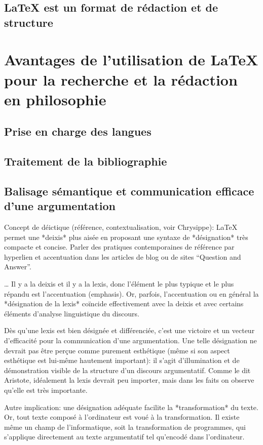 \documentclass{article}
\begin{document}
\subsection{\LaTeX{} est un format de rédaction et de structure}

\section{Avantages de l’utilisation de \LaTeX{} pour la recherche et la rédaction en philosophie}

\subsection{Prise en charge des langues}

\subsection{Traitement de la bibliographie}

\subsection{Balisage sémantique et communication efficace d’une argumentation}

Concept de déictique (référence, contextualisation, voir Chrysippe): LaTeX permet une *deixis* plus aisée en proposant une syntaxe de *désignation* très compacte et concise. Parler des pratiques contemporaines de référence par hyperlien et accentuation dans les articles de blog ou de sites “Question and Answer”.

… Il y a la deixis et il y a la lexis, donc l’élément le plus typique et le plus répandu est l’accentuation (emphasis). Or, parfois, l’accentuation ou en général la *désignation de la lexis* coïncide effectivement avec la deixis et avec certains éléments d’analyse linguistique du discours.

Dès qu’une lexis est bien désignée et différenciée, c’est une victoire et un vecteur d’efficacité pour la communication d’une argumentation. Une telle désignation ne devrait pas être perçue comme purement esthétique (même si son aspect esthétique est lui-même hautement important): il s’agit d’illumination et de démonstration visible de la structure d’un discours argumentatif. Comme le dit Aristote, idéalement la lexis devrait peu importer, mais dans les faits on observe qu’elle est très importante.

Autre implication: une désignation adéquate facilite la *transformation* du texte. Or, tout texte composé à l’ordinateur est voué à la transformation. Il existe même un champ de l’informatique, soit la transformation de programmes, qui s’applique directement au texte argumentatif tel qu’encodé dans l’ordinateur.
\end{document}

